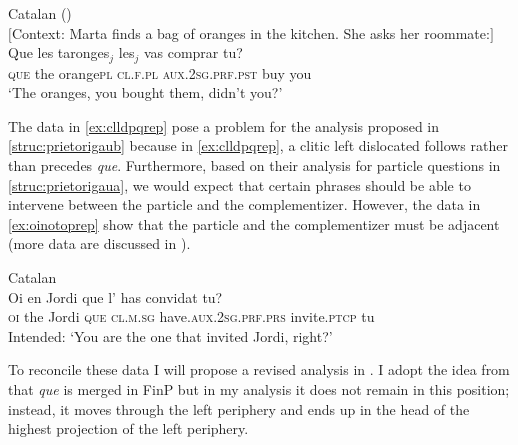 \ea \label{ex:clldpqrep} 	Catalan (\citealt[49: ex 98a]{Kocher2017a})\\ $[$Context: Marta finds a bag of oranges in the kitchen. She asks her roommate:$]$\\
	\gll Que les taronges$_j$  les$_j$ vas comprar tu? \\
	\textsc{que}  the orange\textsc{pl}  \textsc{cl.f.pl} \textsc{aux.2sg.prf.pst} buy you\\ 
	\glt `The oranges, you bought them, didn't you?'
\z



The data in \eqref{ex:clldpqrep} pose a problem for the analysis proposed in \eqref{struc:prietorigaub} because in \eqref{ex:clldpqrep}, a clitic left dislocated  follows rather than precedes \emph{que}. Furthermore, based on their analysis for particle questions in \eqref{struc:prietorigaua}, we would expect that certain phrases should be able to intervene between the particle and the complementizer. However, the data in \eqref{ex:oinotoprep} show that the particle and the complementizer must be adjacent (more data are discussed in ). 


\ea Catalan \label{ex:oinotoprep}\\
\gll * Oi en Jordi que l' has convidat tu?\\
	 \phantom{*} \textsc{oi} the Jordi \textsc{que} \textsc{cl.m.sg} have.\textsc{aux.2sg.prf.prs} invite.\textsc{ptcp} tu\\
	\glt \phantom{*} Intended: `You are the one that invited Jordi, right?'
\z 

To reconcile these data I will propose a revised analysis in . I adopt the idea from \citet{PrietoRigau2007} that \emph{que} is merged in FinP but in my analysis it does not remain in this position;  instead, it moves through the left periphery and ends up in the head of the highest projection of the left periphery.

